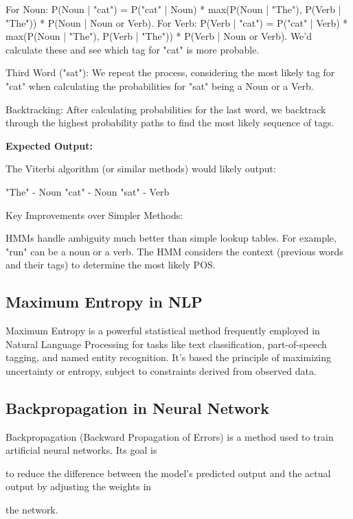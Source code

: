 For Noun: P(Noun | "cat") = P("cat" | Noun) * max(P(Noun | "The"), P(Verb | "The")) * P(Noun | Noun or Verb).
For Verb: P(Verb | "cat") = P("cat" | Verb) * max(P(Noun | "The"), P(Verb | "The")) * P(Verb | Noun or Verb).
We'd calculate these and see which tag for "cat" is more probable.

Third Word ("sat"): We repeat the process, considering the most likely tag for "cat" when calculating the probabilities for "sat" being a Noun or a Verb.

Backtracking:  After calculating probabilities for the last word, we backtrack through the highest probability paths to find the most likely sequence of tags.

\textbf{Expected Output:}

The Viterbi algorithm (or similar methods) would likely output:

"The" - Noun
"cat" - Noun
"sat" - Verb

Key Improvements over Simpler Methods:

HMMs handle ambiguity much better than simple lookup tables.  For example, "run" can be a noun or a verb.  The HMM considers the context (previous words and their tags) to determine the most likely POS.
    \subsection{Maximum Entropy in NLP}
    
    Maximum Entropy is a powerful statistical method frequently employed in Natural Language Processing for tasks like text classification, part-of-speech
    tagging, and named entity recognition. It's based the principle of maximizing uncertainty or entropy, subject to constraints derived from observed data.
	\subsection{Backpropagation in Neural Network}
	
	\vspace{0.5cm}
	
	Backpropagation (Backward Propagation of Errors) is a method used to train artificial neural networks. Its goal is
	
	 to reduce the difference between the model's predicted output and the actual output by adjusting the weights in
	 
	  the network.
	
	\vspace{0.5cm}
	
